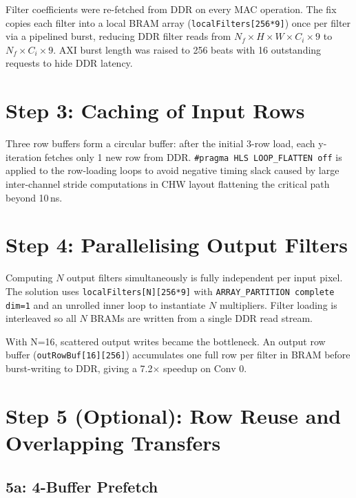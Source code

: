 \documentclass[11pt,a4paper]{article}
\begin{document}
Filter coefficients were re-fetched from DDR on every MAC operation. The fix copies
each filter into a local BRAM array (\texttt{localFilters[256*9]}) once per filter via
a pipelined burst, reducing DDR filter reads from $N_f \times H \times W \times C_i \times 9$
to $N_f \times C_i \times 9$. AXI burst length was raised to 256 beats with 16
outstanding requests to hide DDR latency.

\section{Step 3: Caching of Input Rows}

Three row buffers form a circular buffer: after the initial 3-row load, each y-iteration
fetches only 1 new row from DDR. \texttt{\#pragma HLS LOOP\_FLATTEN off} is applied to
the row-loading loops to avoid negative timing slack caused by large inter-channel stride
computations in CHW layout flattening the critical path beyond 10\,ns.

\section{Step 4: Parallelising Output Filters}

Computing $N$ output filters simultaneously is fully independent per input pixel. The
solution uses \texttt{localFilters[N][256*9]} with \texttt{ARRAY\_PARTITION complete dim=1}
and an unrolled inner loop to instantiate $N$ multipliers. Filter loading is interleaved
so all $N$ BRAMs are written from a single DDR read stream.

With N=16, scattered output writes became the bottleneck. An output row buffer
(\texttt{outRowBuf[16][256]}) accumulates one full row per filter in BRAM before
burst-writing to DDR, giving a 7.2$\times$ speedup on Conv 0.

\section{Step 5 (Optional): Row Reuse and Overlapping Transfers}

\subsection*{5a: 4-Buffer Prefetch}
\end{document}
